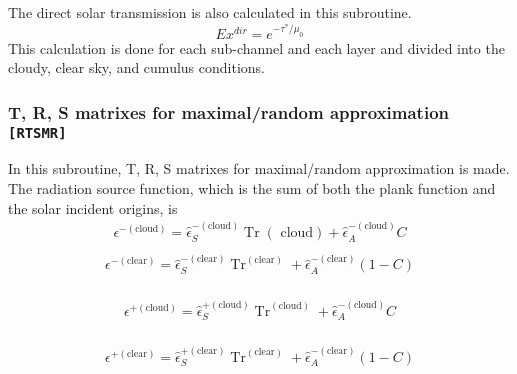 The direct solar transmission is also calculated in this subroutine. \begin{equation}
E x^{d i r}=e^{-\tau^{*}/ \mu_{0}}
\end{equation} This calculation is done for each sub-channel and each layer and
divided into the cloudy, clear sky, and cumulus conditions.

\hypertarget{t-r-s-matrixes-for-maximalrandom-approximation-rtsmr}{%
\subsubsection{\texorpdfstring{T, R, S matrixes for maximal/random
approximation
\texttt{{[}RTSMR{]}}}{T, R, S matrixes for maximal/random approximation {[}RTSMR{]}}}\label{t-r-s-matrixes-for-maximalrandom-approximation-rtsmr}}

In this subroutine, T, R, S matrixes for maximal/random approximation is
made. The radiation source function, which is the sum of both the plank
function and the solar incident origins, is \begin{equation}
\begin{array}{l}
\epsilon^{-(\text {cloud})}=\hat{\epsilon}_{S}^{-(\text {cloud})} \operatorname{Tr}(\text { cloud})+\hat{\epsilon}_{A}^{-(\text {cloud})} C \\
\end{array}
\end{equation} \begin{equation}
\begin{array}{l}
\epsilon^{-(\text {clear})}=\hat{\epsilon}_{S}^{-(\text {clear})} \operatorname{Tr}^{(\text {clear})}+\hat{\epsilon}_{A}^{-(\text {clear})}(1-C) \\
\end{array}
\end{equation}

\begin{equation}
\begin{array}{l}
\epsilon^{+(\text {cloud})}=\hat{\epsilon}_{S}^{+(\text {cloud})} \operatorname{Tr}^{(\text {cloud})}+\hat{\epsilon}_{A}^{-(\text {cloud})} C \\
\end{array}
\end{equation}

\begin{equation}
\begin{array}{l}
\epsilon^{+(\text {clear})}=\hat{\epsilon}_{S}^{+(\text {clear})} \operatorname{Tr}^{(\text {clear})}+\hat{\epsilon}_{A}^{-(\text {clear})}(1-C)
\end{array}
\end{equation}

